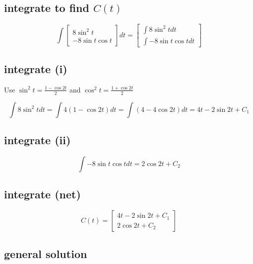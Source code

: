 \documentclass[twocolumn,draft]{article}
\begin{document}
  \subsection*{integrate to find $C(t)$}
  
  \begin{equation*}
  	\int
	\begin{bmatrix}
		8\sin^{2}{t} \\
		-8\sin{t}\cos{t}
	\end{bmatrix}
	dt =
	\begin{bmatrix}
		\int 8\sin^{2}{t} dt \\
		\int -8\sin{t}\cos{t} dt
	\end{bmatrix}
  \end{equation*}
  
  \subsection*{integrate (i)}
  
  Use $\sin^{2}{t}=\frac{1-\cos{2t}}{2}$ and $\cos^{2}{t} = \frac{1+\cos{2t}}{2}$
  
  \begin{equation*}
  	\int 8\sin^{2}{t} dt = \int 4 (1 - \cos{2t})dt = \int (4 - 4\cos{2t})dt = 4t - 2\sin{2t} + C_{1}
  \end{equation*}
  
  \subsection*{integrate (ii)}
  
  \begin{equation*}
  	\int -8 \sin{t}\cos{t}dt = 2\cos{2t} + C_{2}
  \end{equation*}
 
 \subsection*{integrate (net)}
 
 \begin{equation*}
 	C(t) =
	\begin{bmatrix}
		4t - 2\sin{2t} + C_{1} \\
		2\cos{2t} + C_{2}
	\end{bmatrix}
 \end{equation*}
 
 \subsection*{general solution}
 
\end{document}
